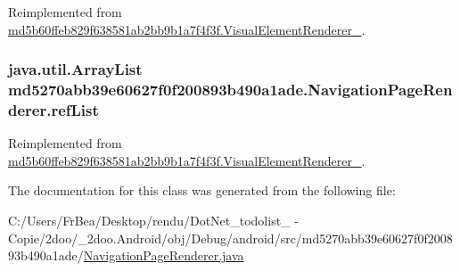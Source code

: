 Reimplemented from \hyperlink{classmd5b60ffeb829f638581ab2bb9b1a7f4f3f_1_1_visual_element_renderer__1_4ef182bc984a4330ed789e1f0b0222d1}{md5b60ffeb829f638581ab2bb9b1a7f4f3f.VisualElementRenderer\_}.\hypertarget{classmd5270abb39e60627f0f200893b490a1ade_1_1_navigation_page_renderer_d437aec87e29f0fb2592513dc48257bd}{
\subsubsection[{refList}]{\setlength{\rightskip}{0pt plus 5cm}java.util.ArrayList {\bf md5270abb39e60627f0f200893b490a1ade.NavigationPageRenderer.refList}}}
\label{classmd5270abb39e60627f0f200893b490a1ade_1_1_navigation_page_renderer_d437aec87e29f0fb2592513dc48257bd}




Reimplemented from \hyperlink{classmd5b60ffeb829f638581ab2bb9b1a7f4f3f_1_1_visual_element_renderer__1_4ebd0e42ebd360712eb189930036fc9f}{md5b60ffeb829f638581ab2bb9b1a7f4f3f.VisualElementRenderer\_}.

The documentation for this class was generated from the following file:\begin{CompactItemize}
\item 
C:/Users/FrBea/Desktop/rendu/DotNet\_\-todolist\_ - Copie/2doo/\_\-2doo.Android/obj/Debug/android/src/md5270abb39e60627f0f200893b490a1ade/\hyperlink{_navigation_page_renderer_8java}{NavigationPageRenderer.java}\end{CompactItemize}
